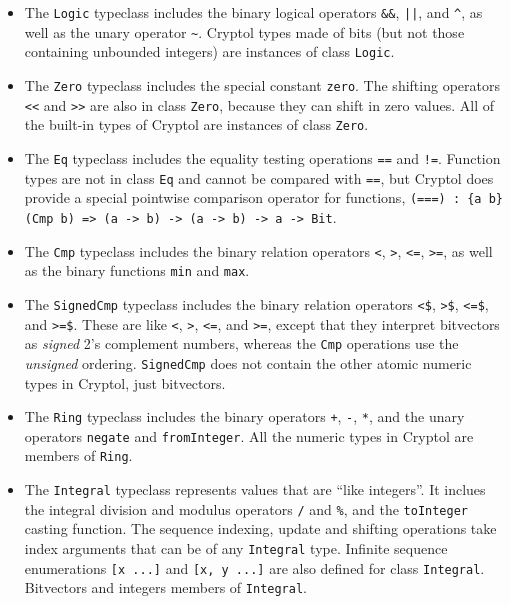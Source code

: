 \begin{itemize}
\item
The \texttt{Logic} typeclass includes the binary logical operators
\texttt{\&\&}, \texttt{||}, and \verb+^+, as well as the unary
operator \verb+~+. Cryptol types made of bits (but not those
containing unbounded integers) are instances of class \texttt{Logic}.

\item
The \texttt{Zero} typeclass includes the special constant
\texttt{zero}. The shifting operators \texttt{<<} and \texttt{>>} are
also in class \texttt{Zero}, because they can shift in zero values.
All of the built-in types of Cryptol are instances of class
\texttt{Zero}.

\item
The \texttt{Eq} typeclass includes the equality testing operations
\texttt{==} and \texttt{!=}. Function types are not in class \texttt{Eq}
and cannot be compared with \texttt{==}, but Cryptol does provide a
special pointwise comparison operator for functions, \texttt{(===) :
  \{a b\} (Cmp b) => (a -> b) -> (a -> b) -> a -> Bit}.

\item
The \texttt{Cmp} typeclass includes the binary relation operators
\texttt{<}, \texttt{>}, \texttt{<=}, \texttt{>=}, as well as the
binary functions \texttt{min} and \texttt{max}.

\item
The \texttt{SignedCmp} typeclass includes the binary relation
operators \texttt{<\$}, \texttt{>\$}, \texttt{<=\$}, and
\texttt{>=\$}. These are like \texttt{<}, \texttt{>}, \texttt{<=}, and
\texttt{>=}, except that they interpret bitvectors as \emph{signed}
2's complement numbers, whereas the \texttt{Cmp} operations use the
\emph{unsigned} ordering. \texttt{SignedCmp} does not contain the
other atomic numeric types in Cryptol, just bitvectors.

\item
The \texttt{Ring} typeclass includes the binary operators \texttt{+},
\texttt{-}, \texttt{*}, and the unary operators \texttt{negate}
and \texttt{fromInteger}.  All the numeric types in Cryptol
are members of \texttt{Ring}.

\item
The \texttt{Integral} typeclass represents values that are ``like
integers''.  It inclues the integral division and modulus operators
\texttt{/} and \texttt{\%}, and the \texttt{toInteger} casting function.
The sequence indexing, update and shifting operations
take index arguments that can be of any \texttt{Integral} type.
Infinite sequence enumerations \texttt{[x ...]}
and \texttt{[x, y ...]} are also defined for class \texttt{Integral}.
Bitvectors and integers members of \texttt{Integral}.


\end{itemize}
